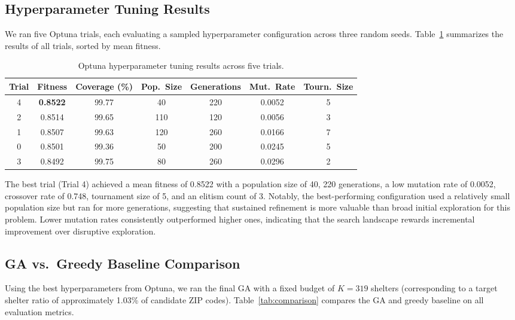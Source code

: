 \documentclass[12pt]{article}
\begin{document}
\subsection{Hyperparameter Tuning Results}

We ran five Optuna trials, each evaluating a sampled hyperparameter configuration across three random seeds. Table~\ref{tab:optuna} summarizes the results of all trials, sorted by mean fitness.

\begin{table}[H]
\centering
\caption{Optuna hyperparameter tuning results across five trials.}
\label{tab:optuna}
\begin{tabular}{ccccccc}
\toprule
Trial & Fitness & Coverage (\%) & Pop.\ Size & Generations & Mut.\ Rate & Tourn.\ Size \\
\midrule
4 & \textbf{0.8522} & 99.77 & 40 & 220 & 0.0052 & 5 \\
2 & 0.8514 & 99.65 & 110 & 120 & 0.0056 & 3 \\
1 & 0.8507 & 99.63 & 120 & 260 & 0.0166 & 7 \\
0 & 0.8501 & 99.36 & 50 & 200 & 0.0245 & 5 \\
3 & 0.8492 & 99.75 & 80 & 260 & 0.0296 & 2 \\
\bottomrule
\end{tabular}
\end{table}

The best trial (Trial 4) achieved a mean fitness of 0.8522 with a population size of 40, 220 generations, a low mutation rate of 0.0052, crossover rate of 0.748, tournament size of 5, and an elitism count of 3. Notably, the best-performing configuration used a relatively small population size but ran for more generations, suggesting that sustained refinement is more valuable than broad initial exploration for this problem. Lower mutation rates consistently outperformed higher ones, indicating that the search landscape rewards incremental improvement over disruptive exploration.

\subsection{GA vs.\ Greedy Baseline Comparison}

Using the best hyperparameters from Optuna, we ran the final GA with a fixed budget of $K = 319$ shelters (corresponding to a target shelter ratio of approximately 1.03\% of candidate ZIP codes). Table~\ref{tab:comparison} compares the GA and greedy baseline on all evaluation metrics.
\end{document}
